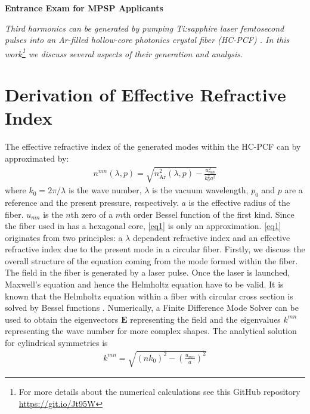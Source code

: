 \documentclass[fleqn, 10pt, twocolumn]{SelfArx}
\begin{document}
%
\begin{center}
\colorbox{color2!10}{\large{}\textcolor{color1}{\sffamily\bfseries Entrance Exam for MPSP Applicants}}
\end{center}
    \textit{Third harmonics can be generated by pumping Ti:sapphire laser femtosecond pulses into an Ar-filled hollow-core photonics crystal fiber (HC-PCF) \cite{Nold2010}. 
        In this work\footnote{For more details about the numerical calculations see this GitHub repository \url{https://git.io/Jt95W}} we discuss several aspects of their generation and analysis.}

    \section{Derivation of Effective Refractive Index}
    The effective refractive index of the generated modes within the HC-PCF can by approximated by:
    \begin{align}
        n^{mn}(\lambda, p) = \sqrt{n^2_{\text{Ar}}(\lambda, p ) - \frac{u_{mn}^2}{k_0^2 a^2}} 
        \label{eq1}
    \end{align}
    where $k_0=2\pi/\lambda$ is the wave number, $\lambda$ is the vacuum wavelength, $p_0$ and $p$ are a reference and the present pressure, respectively. $a$ is the 
    effective radius of the fiber. $u_{mn}$ is the $n$th zero of a $m$th order Bessel function of the first kind. Since the fiber used in \cite{Nold2010} has a hexagonal core, \eqref{eq1} is only an approximation.
    \eqref{eq1} originates from two principles: a $\lambda$ dependent refractive index and an effective refractive index due to the present mode in a circular fiber.
    Firstly, we discuss the overall structure of the equation coming from the mode formed within the fiber. The field in the fiber is generated by a laser pulse. Once the laser is launched, Maxwell's equation and hence the Helmholtz equation have to be valid.
    It is known that the Helmholtz equation within a fiber with circular cross section is solved by Bessel functions \cite{Nickelson2019}. 
    Numerically, a Finite Difference Mode Solver can be used to obtain the eigenvectors $\mathbf E$ representing the field and the eigenvalues $k^{mn}$ representing the wave number for more complex shapes. The analytical solution for cylindrical symmetries is 
    \begin{align}
        k^{mn} = \sqrt{(n k_0)^2 - \left( \frac{u_{mn}}{a}\right)^2}
    \end{align}
\end{document}
